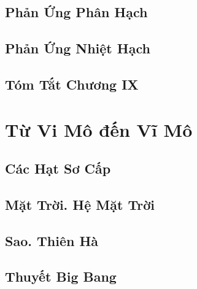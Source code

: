 \documentclass{article}
\numberwithin{equation}{section}
\begin{document}

\subsection{Phản Ứng Phân Hạch}


\subsection{Phản Ứng Nhiệt Hạch}


\subsection{Tóm Tắt Chương IX}


\section{Từ Vi Mô đến Vĩ Mô}

\subsection{Các Hạt Sơ Cấp}


\subsection{Mặt Trời. Hệ Mặt Trời}


\subsection{Sao. Thiên Hà}


\subsection{Thuyết Big Bang}
\end{document}
